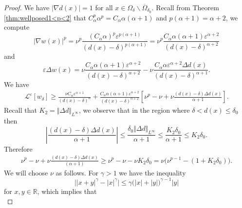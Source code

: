 \documentclass[11pt,reqno]{amsart}
\numberwithin{figure}{section}
\theoremstyle{plain}
\theoremstyle{remark}
\numberwithin{equation}{section}
\begin{document}
\begin{proof} We have $|\nabla d(x)| = 1$ for all $x\in \Omega_\delta\backslash \overline{\Omega}_{\delta_0}$. Recall from Theorem \ref{thm:wellposed1<p<2} that $C_\alpha^p \alpha^p = C_\alpha \alpha (\alpha+1)$ and $p(\alpha+1) = \alpha+2$, we compute 
\begin{equation*}
    |\nabla w(x)|^p = \nu^p\frac{(C_\alpha\alpha)^p\varepsilon^{p(\alpha+1)}}{(d(x)-\delta)^{p(\alpha+1)}} = \nu^p\frac{C_\alpha \alpha(\alpha+1)\varepsilon^{\alpha+2}}{(d(x)-\delta)^{\alpha+2}}
\end{equation*}
and
\begin{equation*}
    \varepsilon\Delta w(x) = \nu\frac{C_\alpha\alpha(\alpha+1)\varepsilon^{\alpha+2}}{(d(x)-\delta)^{\alpha+2}} - \nu\frac{C_\alpha\alpha\varepsilon^{\alpha+2}\Delta d(x)}{(d(x)-\delta)^{\alpha+1}}.
\end{equation*}
We have
\begin{equation*}
    \begin{split}
        \mathcal{L}^\varepsilon\left[w_\delta\right] \geq \frac{\nu C_\alpha\varepsilon^{\alpha+1}}{(d(x)-\delta)^\alpha} + \frac{C_\alpha \alpha (\alpha+1)\varepsilon^{\alpha+2}}{(d(x)-\delta)^{\alpha+2}}\left[\nu^p-\nu +\nu\frac{(d(x)-\delta)\Delta d(x)}{\alpha+1}\right].
    \end{split}
\end{equation*}
Recall that $K_2= \Vert \Delta d\Vert_{L^\infty}$, we observe that in the region where $\delta< d(x)\leq \delta_0$ then
\begin{equation*}
    \left|\frac{(d(x)-\delta)\Delta d(x)}{\alpha+1}\right| \leq \frac{\delta_0\Vert \Delta d\Vert_{L^\infty}}{\alpha+1} \leq \frac{K_2\delta_0}{\alpha+1}\leq K_2\delta_0.
\end{equation*}
Therefore
\begin{equation}\label{e:choose_nu}
    \begin{split}
        \nu^p-\nu +\nu\frac{(d(x)-\delta)\Delta d(x)}{(\alpha+1)} \geq \nu^p - \nu - \nu K_2\delta_0 = \nu\Big(\nu^{p-1} - (1+K_2\delta_0)\Big).
    \end{split}
\end{equation}
We will choose $\nu$ as follows. For $\gamma>1$ we have the inequality
\begin{equation*}
    \Big||x+y|^\gamma - |x|^\gamma\Big|\leq \gamma\Big(|x|+|y|\Big)^{\gamma-1}|y|
\end{equation*}
for $x,y\in \mathbb{R}$, which implies that
\begin{equation*}

\end{equation*}
\end{proof}
\end{document}

